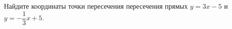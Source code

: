 \begin{ex}
	\begin{condition}
		Найдите координаты точки пересечения пересечения прямых \( y=3x-5 \) и \( y=-\dfrac{1}{3}x+5 \).
	\end{condition}
\end{ex}